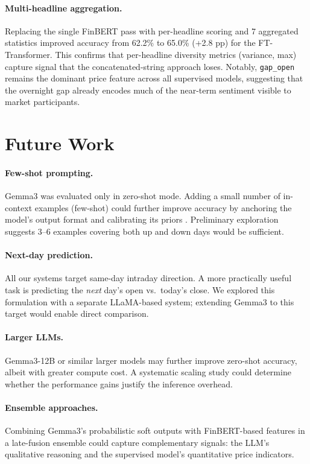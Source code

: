 \documentclass[11pt]{article}
\begin{document}
\paragraph{Multi-headline aggregation.} Replacing the single FinBERT pass with per-headline scoring and 7 aggregated statistics improved accuracy from 62.2\% to 65.0\% (+2.8 pp) for the FT-Transformer. This confirms that per-headline diversity metrics (variance, max) capture signal that the concatenated-string approach loses. Notably, \texttt{gap\_open} remains the dominant price feature across all supervised models, suggesting that the overnight gap already encodes much of the near-term sentiment visible to market participants.

\section{Future Work}
\label{sec:future}

\paragraph{Few-shot prompting.} Gemma3 was evaluated only in zero-shot mode. Adding a small number of in-context examples (few-shot) could further improve accuracy by anchoring the model's output format and calibrating its priors \citep{brown2020gpt3}. Preliminary exploration suggests 3--6 examples covering both up and down days would be sufficient.

\paragraph{Next-day prediction.} All our systems target same-day intraday direction. A more practically useful task is predicting the \emph{next} day's open vs.\ today's close. We explored this formulation with a separate LLaMA-based system; extending Gemma3 to this target would enable direct comparison.

\paragraph{Larger LLMs.} Gemma3-12B or similar larger models may further improve zero-shot accuracy, albeit with greater compute cost. A systematic scaling study could determine whether the performance gains justify the inference overhead.

\paragraph{Ensemble approaches.} Combining Gemma3's probabilistic soft outputs with FinBERT-based features in a late-fusion ensemble could capture complementary signals: the LLM's qualitative reasoning and the supervised model's quantitative price indicators.
\end{document}
